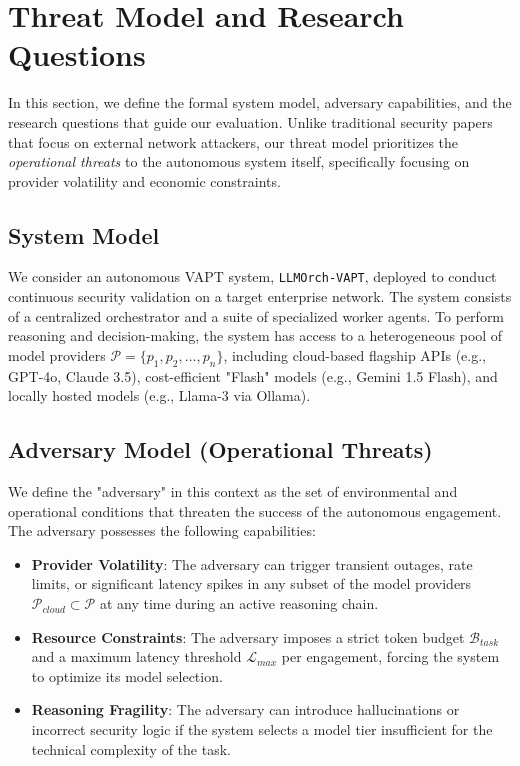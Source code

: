 \section{Threat Model and Research Questions}
\label{sec:threat}

In this section, we define the formal system model, adversary capabilities, and the research questions that guide our evaluation. Unlike traditional security papers that focus on external network attackers, our threat model prioritizes the \textit{operational threats} to the autonomous system itself, specifically focusing on provider volatility and economic constraints.

\subsection{System Model}
We consider an autonomous VAPT system, \texttt{LLMOrch-VAPT}, deployed to conduct continuous security validation on a target enterprise network. The system consists of a centralized orchestrator and a suite of specialized worker agents. To perform reasoning and decision-making, the system has access to a heterogeneous pool of model providers $\mathcal{P} = \{p_1, p_2, \dots, p_n\}$, including cloud-based flagship APIs (e.g., GPT-4o, Claude 3.5), cost-efficient "Flash" models (e.g., Gemini 1.5 Flash), and locally hosted models (e.g., Llama-3 via Ollama).

\subsection{Adversary Model (Operational Threats)}
We define the "adversary" in this context as the set of environmental and operational conditions that threaten the success of the autonomous engagement. The adversary possesses the following capabilities:
\begin{itemize}
    \item \textbf{Provider Volatility}: The adversary can trigger transient outages, rate limits, or significant latency spikes in any subset of the model providers $\mathcal{P}_{cloud} \subset \mathcal{P}$ at any time during an active reasoning chain.
    \item \textbf{Resource Constraints}: The adversary imposes a strict token budget $\mathcal{B}_{task}$ and a maximum latency threshold $\mathcal{L}_{max}$ per engagement, forcing the system to optimize its model selection.
    \item \textbf{Reasoning Fragility}: The adversary can introduce hallucinations or incorrect security logic if the system selects a model tier insufficient for the technical complexity of the task.
\end{itemize}

